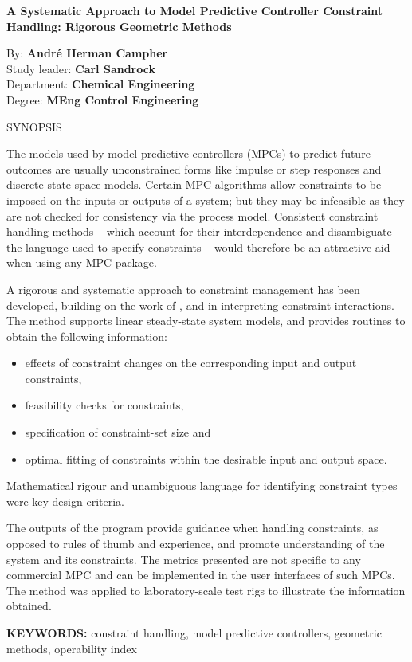 \begin{center} \textbf{\Large A Systematic Approach to Model Predictive Controller Constraint Handling: Rigorous Geometric Methods}
\end{center}
\bigskip
By: \textbf{Andr\'e Herman Campher}\\
Study leader: \textbf{Carl Sandrock}\\
Department: \textbf{Chemical Engineering}\\
Degree: \textbf{MEng Control Engineering}
\vfill
\begin{center} \Large{SYNOPSIS}
\end{center}
\vfill
The models used by model predictive controllers (MPCs) to predict future outcomes are usually unconstrained forms like impulse or step responses and discrete state space models. 
Certain MPC algorithms allow constraints  to be imposed on the inputs or outputs of a system; but they may be infeasible as they are not checked for consistency via the process model. 
Consistent constraint handling methods -- which account for their interdependence and disambiguate the language used to specify constraints -- would therefore be an attractive aid when using any MPC package.

A rigorous and systematic approach to constraint management has been developed, building on the work of \citet{vinsonphd}, \citet{limaphd} and \citet{opconproc} in interpreting constraint interactions. 
The method supports linear steady-state system models, and provides routines to obtain the following information:
\begin{itemize}
  \item effects of constraint changes on the corresponding input and output constraints,
  \item feasibility checks for constraints,
  \item specification of constraint-set size and
  \item optimal fitting of constraints within the desirable input and output space.
\end{itemize}
Mathematical rigour and unambiguous language for identifying constraint types were key design criteria. 

The outputs of the program provide guidance when handling constraints, as opposed to rules of thumb and experience, and promote understanding of the system and its constraints.
The metrics presented are not specific to any commercial MPC and can be implemented in the user interfaces of such MPCs.
The method was applied to laboratory-scale test rigs to illustrate the information obtained.
\vfill

\noindent \textbf{KEYWORDS:} constraint handling, model predictive
controllers, geometric methods, operability index

